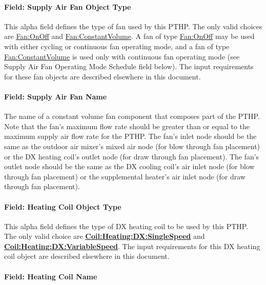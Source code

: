 \paragraph{Field: Supply Air Fan Object Type}\label{field-supply-air-fan-object-type-6}

This alpha field defines the type of fan used by this PTHP. The only valid choices are \hyperref[fanonoff]{Fan:OnOff} and \hyperref[fanconstantvolume]{Fan:ConstantVolume}. A fan of type \hyperref[fanonoff]{Fan:OnOff} may be used with either cycling or continuous fan operating mode, and a fan of type \hyperref[fanconstantvolume]{Fan:ConstantVolume} is used only with continuous fan operating mode (see Supply Air Fan Operating Mode Schedule field below). The input requirements for these fan objects are described elsewhere in this document.

\paragraph{Field: Supply Air Fan Name}\label{field-supply-air-fan-name-5}

The name of a constant volume fan component that composes part of the PTHP. Note that the fan's maximum flow rate should be greater than or equal to the maximum supply air flow rate for the PTHP. The fan's inlet node should be the same as the outdoor air mixer's mixed air node (for blow through fan placement) or the DX heating coil's outlet node (for draw through fan placement). The fan's outlet node should be the same as the DX cooling coil's air inlet node (for blow through fan placement) or the supplemental heater's air inlet node (for draw through fan placement).

\paragraph{Field: Heating Coil Object Type}\label{field-heating-coil-object-type-4-000}

This alpha field defines the type of DX heating coil to be used by this PTHP. The only valid choice are \textbf{\hyperref[coilheatingdxsinglespeed]{Coil:Heating:DX:SingleSpeed}} and \textbf{\hyperref[coilheatingdxvariablespeed]{Coil:Heating:DX:VariableSpeed}}. The input requirements for this DX heating coil object are described elsewhere in this document.

\paragraph{Field: Heating Coil Name}\label{field-heating-coil-name-4-000}


